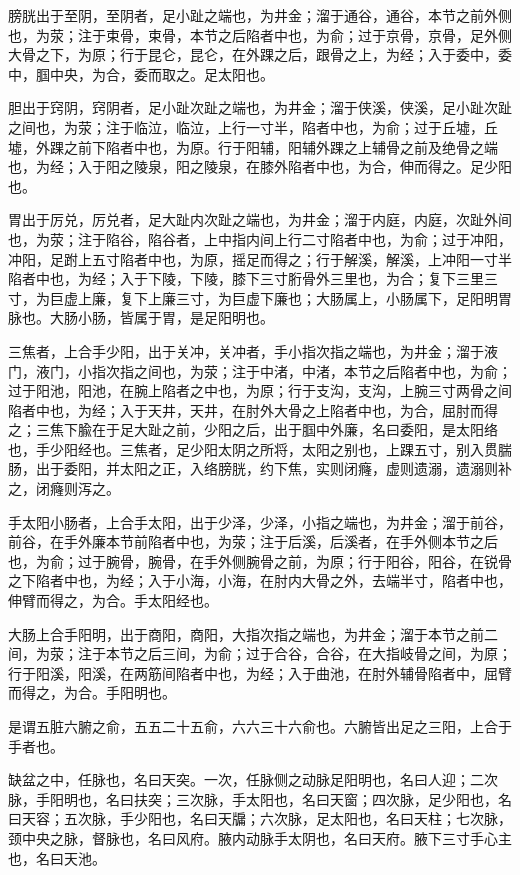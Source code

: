 \documentclass[a4paper,12pt,UTF8,twoside]{ctexbook}
\begin{document}
	膀胱出于至阴，至阴者，足小趾之端也，为井金；溜于通谷，通谷，本节之前外侧也，为荥；注于束骨，束骨，本节之后陷者中也，为俞；过于京骨，京骨，足外侧大骨之下，为原；行于昆仑，昆仑，在外踝之后，跟骨之上，为经；入于委中，委中，腘中央，为合，委而取之。足太阳也。
	
	胆出于窍阴，窍阴者，足小趾次趾之端也，为井金；溜于侠溪，侠溪，足小趾次趾之间也，为荥；注于临泣，临泣，上行一寸半，陷者中也，为俞；过于丘墟，丘墟，外踝之前下陷者中也，为原。行于阳辅，阳辅外踝之上辅骨之前及绝骨之端也，为经；入于阳之陵泉，阳之陵泉，在膝外陷者中也，为合，伸而得之。足少阳也。
	
	胃出于厉兑，厉兑者，足大趾内次趾之端也，为井金；溜于内庭，内庭，次趾外间也，为荥；注于陷谷，陷谷者，上中指内间上行二寸陷者中也，为俞；过于冲阳，冲阳，足跗上五寸陷者中也，为原，摇足而得之；行于解溪，解溪，上冲阳一寸半陷者中也，为经；入于下陵，下陵，膝下三寸胻骨外三里也，为合；复下三里三寸，为巨虚上廉，复下上廉三寸，为巨虚下廉也；大肠属上，小肠属下，足阳明胃脉也。大肠小肠，皆属于胃，是足阳明也。
	
	三焦者，上合手少阳，出于关冲，关冲者，手小指次指之端也，为井金；溜于液门，液门，小指次指之间也，为荥；注于中渚，中渚，本节之后陷者中也，为俞；过于阳池，阳池，在腕上陷者之中也，为原；行于支沟，支沟，上腕三寸两骨之间陷者中也，为经；入于天井，天井，在肘外大骨之上陷者中也，为合，屈肘而得之；三焦下腧在于足大趾之前，少阳之后，出于腘中外廉，名曰委阳，是太阳络也，手少阳经也。三焦者，足少阳太阴之所将，太阳之别也，上踝五寸，别入贯腨肠，出于委阳，并太阳之正，入络膀胱，约下焦，实则闭癃，虚则遗溺，遗溺则补之，闭癃则泻之。
	
	手太阳小肠者，上合手太阳，出于少泽，少泽，小指之端也，为井金；溜于前谷，前谷，在手外廉本节前陷者中也，为荥；注于后溪，后溪者，在手外侧本节之后也，为俞；过于腕骨，腕骨，在手外侧腕骨之前，为原；行于阳谷，阳谷，在锐骨之下陷者中也，为经；入于小海，小海，在肘内大骨之外，去端半寸，陷者中也，伸臂而得之，为合。手太阳经也。
	
	大肠上合手阳明，出于商阳，商阳，大指次指之端也，为井金；溜于本节之前二间，为荥；注于本节之后三间，为俞；过于合谷，合谷，在大指岐骨之间，为原；行于阳溪，阳溪，在两筋间陷者中也，为经；入于曲池，在肘外辅骨陷者中，屈臂而得之，为合。手阳明也。
	
	是谓五脏六腑之俞，五五二十五俞，六六三十六俞也。六腑皆出足之三阳，上合于手者也。
	
	缺盆之中，任脉也，名曰天突。一次，任脉侧之动脉足阳明也，名曰人迎；二次脉，手阳明也，名曰扶突；三次脉，手太阳也，名曰天窗；四次脉，足少阳也，名曰天容；五次脉，手少阳也，名曰天牖；六次脉，足太阳也，名曰天柱；七次脉，颈中央之脉，督脉也，名曰风府。腋内动脉手太阴也，名曰天府。腋下三寸手心主也，名曰天池。
	
\end{document}

